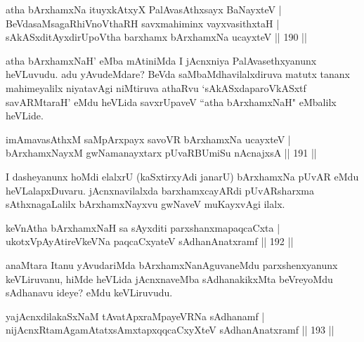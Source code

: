 \begin{shl}
atha bArxhamxNa ituyxkAtxyX PalAvasAthx\s sayx BaNayxteV |\\
BeVdasaMsagaRhiVnoV\s thaRH savxmahiminx vayxvasithxtaH |\\
sAkASxditAyxdirUpoV\s tha barxhamx bArxhamxNa ucayxteV \hfill || 190 ||
\end{shl}

\begin{artha}
atha bArxhamxNaH' eMba mAtiniMda I jAcnxniya PalAvasethxyanunx heVLuvudu. adu yAvudeMdare? BeVda saMbaMdhavilalxdiruva matutx tananx mahimeyalilx niyatavAgi niMtiruva athaRvu `sAkASxdaparoVkASxtf savARMtaraH' eMdu heVLida savxrUpaveV ``atha bArxhamxNaH" eMbalilx heVLide.
\end{artha}


\begin{shl}
imAmavasAthxM saMpArxpayx savoVR bArxhamxNa ucayxteV |\\
bArxhamxNayxM gwNamanayxtarx pUvaRBUmiSu nAcnajxsA \hfill || 191 ||
\end{shl}

\begin{artha}
I dasheyanunx hoMdi elalxrU (kaSxtirxyAdi janarU) bArxhamxNa pUvAR eMdu heVLalapxDuvaru. jAcnxnavilalxda barxhamxcayARdi pUvARsharxma sAthxnagaLalilx bArxhamxNayxvu gwNaveV muKayxvAgi ilalx.
\end{artha}


\begin{shl}
keVnAtha bArxhamxNaH sa sAyxditi parxshanxmapaqcaCxta |\\
ukotxVpAyAtireVkeVNa paqcaCxyateV sAdhanAnatxramf \hfill || 192 ||
\end{shl}

\begin{artha}
anaMtara Itanu yAvudariMda bArxhamxNanAguvaneMdu parxshenxyanunx keVLiruvanu, hiMde heVLida jAcnxnaveMba sAdhanakikxMta beVreyoMdu sAdhanavu ideye? eMdu keVLiruvudu.
\end{artha}


\begin{shl}
yajAcnxdilakaSxNaM tAvatApxraMpayeVRNa sAdhanamf |\\
nijAcnxRtamAgamAtatxsAmxtapxqqcaCxyXteV sAdhanAnatxramf \hfill || 193 ||
\end{shl}

